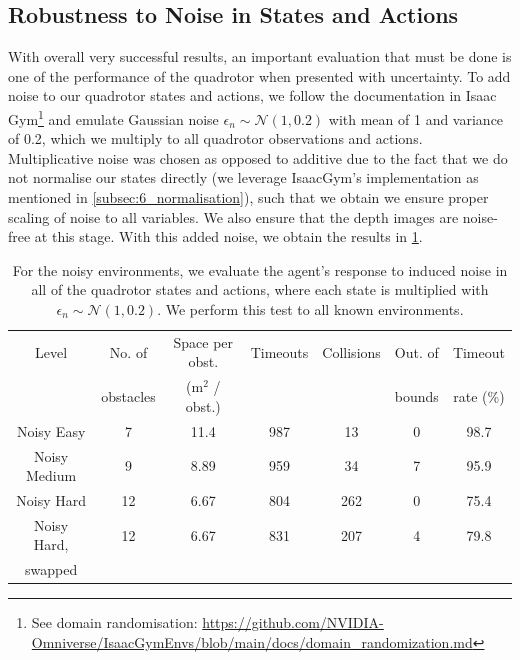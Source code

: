 \subsection{Robustness to Noise in States and Actions}
With overall very successful results, an important evaluation that must be done is one of the performance of the quadrotor when presented with uncertainty. To add noise to our quadrotor states and actions, we follow the documentation in Isaac Gym\footnote{See domain randomisation: \url{https://github.com/NVIDIA-Omniverse/IsaacGymEnvs/blob/main/docs/domain_randomization.md}} and emulate Gaussian noise $\epsilon_n \sim \mathcal{N}(1, 0.2)$ with mean of 1 and variance of 0.2, which we multiply to all quadrotor observations and actions. Multiplicative noise was chosen as opposed to additive due to the fact that we do not normalise our states directly (we leverage IsaacGym's implementation as mentioned in \cref{subsec:6_normalisation}), such that we obtain we ensure proper scaling of noise to all variables. We also ensure that the depth images are noise-free at this stage. With this added noise, we obtain the results in \cref{tab:7_noise_known_tests}.
\begin{table}[htb]
    \centering
    \begin{tabular}{||c|c|c|c|c|c|c||}
    \hline
    Level & No. of & Space per obst. & Timeouts & Collisions & Out. of & Timeout \\  
     & obstacles & (m$^2$ / obst.) & & & bounds & rate (\%) \\\hline\hline
    Noisy Easy    & 7  & 11.4   & 987 & 13 & 0 &  98.7 \\\hline
    Noisy Medium  & 9  & 8.89   & 959 & 34 & 7 &  95.9 \\\hline
    Noisy Hard    & 12  & 6.67  & 804 & 262 & 0 & 75.4 \\\hline
    Noisy Hard,    & 12  & 6.67  & 831 & 207 & 4 & 79.8 \\
    swapped & & & & & &\\\hline
    \end{tabular}
    \caption{For the noisy environments, we evaluate the agent's response to induced noise in all of the quadrotor states and actions, where each state is multiplied with $\epsilon_n \sim \mathcal{N}(1, 0.2)$. We perform this test to all known environments.}
    \label{tab:7_noise_known_tests}
\end{table}
